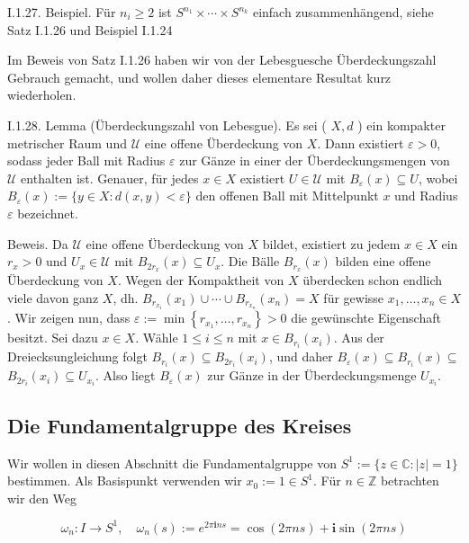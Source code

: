 \documentclass[10pt, letterpaper]{article}
\begin{document}
I.1.27. Beispiel. Für $n_{i} \geq 2$ ist $S^{n_{1}} \times \cdots \times S^{n_{k}}$ einfach zusammenhängend, siehe Satz I.1.26 und Beispiel I.1.24

Im Beweis von Satz I.1.26 haben wir von der Lebesguesche Überdeckungszahl Gebrauch gemacht, und wollen daher dieses elementare Resultat kurz wiederholen.


I.1.28. Lemma (Überdeckungszahl von Lebesgue). Es sei ( $X, d$ ) ein kompakter metrischer Raum und $\mathcal{U}$ eine offene Überdeckung von $X$. Dann existiert $\varepsilon>0$, sodass jeder Ball mit Radius $\varepsilon$ zur Gänze in einer der Überdeckungsmengen von $\mathcal{U}$ enthalten ist. Genauer, für jedes $x \in X$ existiert $U \in \mathcal{U}$ mit $B_{\varepsilon}(x) \subseteq U$, wobei $B_{\varepsilon}(x):=\{y \in X: d(x, y)<\varepsilon\}$ den offenen Ball mit Mittelpunkt $x$ und Radius $\varepsilon$ bezeichnet.

Beweis. Da $\mathcal{U}$ eine offene Überdeckung von $X$ bildet, existiert zu jedem $x \in X$ ein $r_{x}>0$ und $U_{x} \in \mathcal{U}$ mit $B_{2 r_{x}}(x) \subseteq U_{x}$. Die Bälle $B_{r_{x}}(x)$ bilden eine offene Überdeckung von $X$. Wegen der Kompaktheit von $X$ überdecken schon endlich viele davon ganz $X$, dh. $B_{r_{x_{1}}}\left(x_{1}\right) \cup \cdots \cup B_{r_{x_{n}}}\left(x_{n}\right)=X$ für gewisse $x_{1}, \ldots, x_{n} \in X$. Wir zeigen nun, dass $\varepsilon:=\min \left\{r_{x_{1}}, \ldots, r_{x_{n}}\right\}>0$ die gewünschte Eigenschaft besitzt. Sei dazu $x \in X$. Wähle $1 \leq i \leq n$ mit $x \in B_{r_{i}}\left(x_{i}\right)$. Aus der Dreiecksungleichung folgt $B_{r_{i}}(x) \subseteq B_{2 r_{i}}\left(x_{i}\right)$, und daher $B_{\varepsilon}(x) \subseteq B_{r_{i}}(x) \subseteq$ $B_{2 r_{i}}\left(x_{i}\right) \subseteq U_{x_{i}}$. Also liegt $B_{\varepsilon}(x)$ zur Gänze in der Überdeckungsmenge $U_{x_{i}}$.\\



\pagebreak


\subsection{Die Fundamentalgruppe des Kreises}


Wir wollen in diesen Abschnitt die Fundamentalgruppe von $S^{1}:=\{z \in \mathbb{C}:|z|=1\}$ bestimmen. Als Basispunkt verwenden wir $x_{0}:=1 \in S^{1}$. Für $n \in \mathbb{Z}$ betrachten wir den Weg

$$
\omega_{n}: I \rightarrow S^{1}, \quad \omega_{n}(s):=e^{2 \pi \mathbf{i} n s}=\cos (2 \pi n s)+\mathbf{i} \sin (2 \pi n s)
$$
\end{document}
